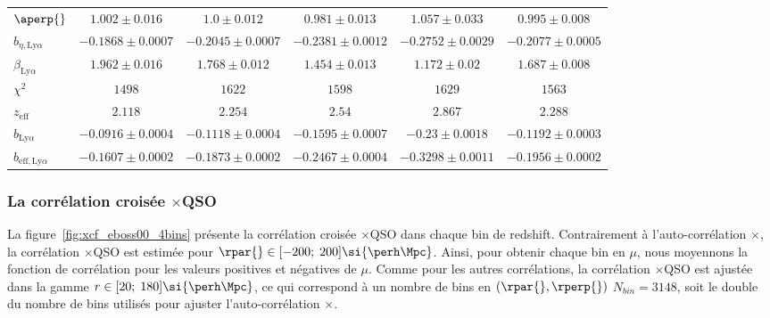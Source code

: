 \begin{table}[h]
\begin{tabular}{lccccc}
    $\aperp{} $ & $ 1.002 \pm 0.016$ & $ 1.0 \pm 0.012$ & $ 0.981 \pm 0.013$ & $ 1.057 \pm 0.033$ & $ 0.995 \pm 0.008$ \\
    $b_{\eta, \mathrm{Ly}\alpha} $ & $ -0.1868 \pm 0.0007$ & $ -0.2045 \pm 0.0007$ & $ -0.2381 \pm 0.0012$ & $ -0.2752 \pm 0.0029$ & $ -0.2077 \pm 0.0005$ \\
    $\beta_{\mathrm{Ly}\alpha} $ & $ 1.962 \pm 0.016$ & $ 1.768 \pm 0.012$ & $ 1.454 \pm 0.013$ & $ 1.172 \pm 0.02$ & $ 1.687 \pm 0.008$ \\
    \midrule
    $\chi^2$ & $ 1498 $ & $ 1622 $ & $ 1598 $ & $ 1629 $ & $ 1563 $ \\
    $z_{\mathrm{eff}}$ & $ 2.118 $ & $ 2.254 $ & $ 2.54 $ & $ 2.867 $ & $ 2.288 $ \\
    \midrule
    $b_{\mathrm{Ly}\alpha} $ & $ -0.0916 \pm 0.0004$ & $ -0.1118 \pm 0.0004$ & $ -0.1595 \pm 0.0007$ & $ -0.23 \pm 0.0018$ & $ -0.1192 \pm 0.0003$ \\
    $b_{\mathrm{eff}, \mathrm{Ly}\alpha} $ & $ -0.1607 \pm 0.0002$ & $ -0.1873 \pm 0.0002$ & $ -0.2467 \pm 0.0004$ & $ -0.3298 \pm 0.0011$ & $ -0.1956 \pm 0.0002$ \\
    \bottomrule
  \end{tabular}
\end{table}



\subsubsection{La corrélation croisée \lya{}$\times$QSO}
La figure~\ref{fig:xcf_eboss00_4bins} présente la corrélation croisée \lya{}$\times$QSO dans chaque bin de redshift.
Contrairement à l'auto-corrélation \lya{}$\times$\lya{}, la corrélation \lya{}$\times$QSO est estimée pour $\rpar{} \in [-200;\;200] \si{\perh\Mpc}$.
Ainsi, pour obtenir chaque bin en $\mu$, nous moyennons la fonction de corrélation pour les valeurs positives et négatives de $\mu$.
Comme pour les autres corrélations, la corrélation \lya{}$\times$QSO est ajustée dans la gamme $r \in [20;\;180] \si{\perh\Mpc}$, ce qui correspond à un nombre de bins en $(\rpar{}, \rperp{})$ $N_{bin} = \num{3148}$, soit le double du nombre de bins utilisés pour ajuster l'auto-corrélation \lya{}$\times$\lya{}.

